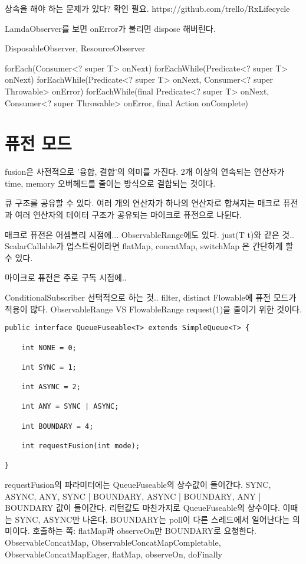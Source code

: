 \documentclass{book}
\begin{document}
 


상속을 해야 하는 문제가 있다? 확인 필요.
https://github.com/trello/RxLifecycle

LamdaObserver를 보면 onError가 불리면 dispose 해버린다.

DisposableObserver, ResourceObserver

forEach(Consumer<? super T> onNext)
forEachWhile(Predicate<? super T> onNext)
forEachWhile(Predicate<? super T> onNext, Consumer<? super Throwable> onError)
forEachWhile(final Predicate<? super T> onNext, Consumer<? super Throwable> onError,
            final Action onComplete)

\section{퓨전 모드}
fusion은 사전적으로 '융합, 결합'의 의미를 가진다.
2개 이상의 연속되는 연산자가 time, memory 오버헤드를 줄이는 방식으로 결합되는 것이다.

큐 구조를 공유할 수 있다.
여러 개의 연산자가 하나의 연산자로 합쳐지는 매크로 퓨전과 여러 연산자의 데이터 구조가 공유되는 마이크로 퓨전으로 나뒨다.

매크로 퓨전은 어셈블리 시점에...
ObservableRange에도 있다.
just(T t)와 같은 것..
ScalarCallable가 업스트림이라면 flatMap, concatMap, switchMap 은 간단하게 할 수 있다.

마이크로 퓨전은 주로 구독 시점에..

ConditionalSubscriber 선택적으로 하는 것..
filter, distinct
Flowable에 퓨전 모드가 적용이 많다.
ObservableRange VS FlowableRange
request(1)을 줄이기 위한 것이다.

\begin{verbatim}
public interface QueueFuseable<T> extends SimpleQueue<T> {

    int NONE = 0;

    int SYNC = 1;

    int ASYNC = 2;

    int ANY = SYNC | ASYNC;

    int BOUNDARY = 4;

    int requestFusion(int mode);
    
}    
\end{verbatim}

requestFusion의 파라미터에는 QueueFuseable의 상수값이 들어간다.
SYNC, ASYNC, ANY, SYNC | BOUNDARY, ASYNC | BOUNDARY, ANY | BOUNDARY 값이 들어간다.
리턴값도 마찬가지로 QueueFuseable의 상수이다. 이때는 SYNC, ASYNC만 나온다.
BOUNDARY는 poll이 다른 스레드에서 일어난다는 의미이다. 
호출하는 쪽:
flatMap과 observeOn만 BOUNDARY로 요청한다.
ObservableConcatMap, ObservableConcatMapCompletable, ObservableConcatMapEager,
flatMap, observeOn, doFinally
\end{document}
